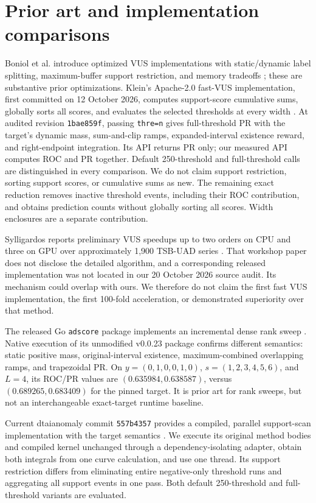\section{Prior art and implementation comparisons}
Boniol et al. introduce optimized VUS implementations with static/dynamic
label splitting, maximum-buffer support restriction, and memory tradeoffs
\cite{boniol2025}; these are substantive prior optimizations.
Klein's Apache-2.0 fast-VUS implementation, first committed on 12 October
2026, computes support-score cumulative sums, globally sorts all scores, and
evaluates the selected thresholds at every width \cite{klein2026}.
At audited revision \texttt{1bae859f}, passing \texttt{thre=n} gives full-threshold
PR with the target's dynamic mass, sum-and-clip ramps, expanded-interval
existence reward, and right-endpoint integration. Its API returns PR only;
our measured API computes ROC and PR together. Default 250-threshold and
full-threshold calls are distinguished in every comparison.
We do not claim support restriction, sorting support scores, or cumulative
sums as new. The remaining exact reduction removes inactive threshold events,
including their ROC contribution, and obtains prediction counts without
globally sorting all scores. Width enclosures are a separate contribution.

Sylligardos reports preliminary VUS speedups up to two
orders on CPU and three on GPU over approximately 1,900 TSB-UAD series
\cite{sylligardos2025}. That workshop paper does not disclose the detailed
algorithm, and a corresponding released implementation was not located in our
20 October 2026 source audit. Its mechanism could overlap with ours. We therefore
do not claim the first fast VUS implementation, the first 100-fold acceleration,
or demonstrated superiority over that method.

The released Go \texttt{adscore} package implements an incremental dense rank
sweep \cite{boxer}. Native execution of its unmodified v0.0.23 package confirms
different semantics: static positive mass, original-interval existence,
maximum-combined overlapping ramps, and trapezoidal PR. On
$y=(0,\allowbreak 1,\allowbreak 0,\allowbreak 0,\allowbreak 1,\allowbreak 0)$, $s=(1,\allowbreak 2,\allowbreak 3,\allowbreak 4,\allowbreak 5,\allowbreak 6)$, and $L=4$, its ROC/PR values are
$(0.635984,\allowbreak 0.638587)$, versus $(0.689265,\allowbreak 0.683409)$ for the pinned target.
It is prior art for rank sweeps, but not an interchangeable exact-target
runtime baseline.

Current dtaianomaly commit \texttt{557b4357} provides a compiled, parallel
support-scan implementation with the target semantics \cite{dtaianomaly}.
We execute its original method bodies and compiled kernel unchanged through a
dependency-isolating adapter, obtain both integrals from one curve calculation,
and use one thread. Its support restriction differs from eliminating entire
negative-only threshold runs and aggregating all support events in one pass.
Both default 250-threshold and full-threshold variants are evaluated.

